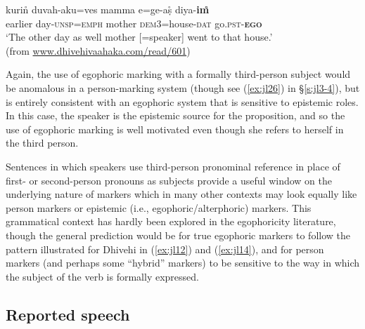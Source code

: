 \documentclass[output=paper]{langsci/langscibook}
\begin{document}
\begin{exe}
	\ex 	\label{ex:jl14}
	\gll kurin̊ duvah-aku=ves mamma e=ge-aṣ̊ diya-\textbf{im̊}\\
	earlier day-\textsc{unsp}=\textsc{emph} mother \textsc{dem}3=house-\textsc{dat} go.\textsc{pst}-\textbf{\textsc{ego}}\\
	\trans ‘The other day as well mother [=speaker] went to that house.’ \\(from \url{www.dhivehivaahaka.com/read/601})
\end{exe}


Again, the use of egophoric marking with a formally third-person subject would be anomalous in a person-marking system (though see (\ref{ex:jl26}) in §‎\ref{s:jl3-4}), but is entirely consistent with an egophoric system that is sensitive to epistemic roles. In this case, the speaker is the epistemic source for the proposition, and so the use of egophoric marking is well motivated even though she refers to herself in the third person. 

   Sentences in which speakers use third-person pronominal reference in place of first- or second-person pronouns as subjects provide a useful window on the underlying nature of markers which in many other contexts may look equally like person markers or epistemic (i.e., egophoric/alterphoric) markers. This grammatical context has hardly been explored in the egophoricity literature, though the general prediction would be for true egophoric markers to follow the pattern illustrated for Dhivehi in (\ref{ex:jl12}) and (\ref{ex:jl14}), and for person markers (and perhaps some “hybrid” markers) to be sensitive to the way in which the subject of the verb is formally expressed. 

\subsection{Reported speech}\label{s:jl3-3}
\end{document}
